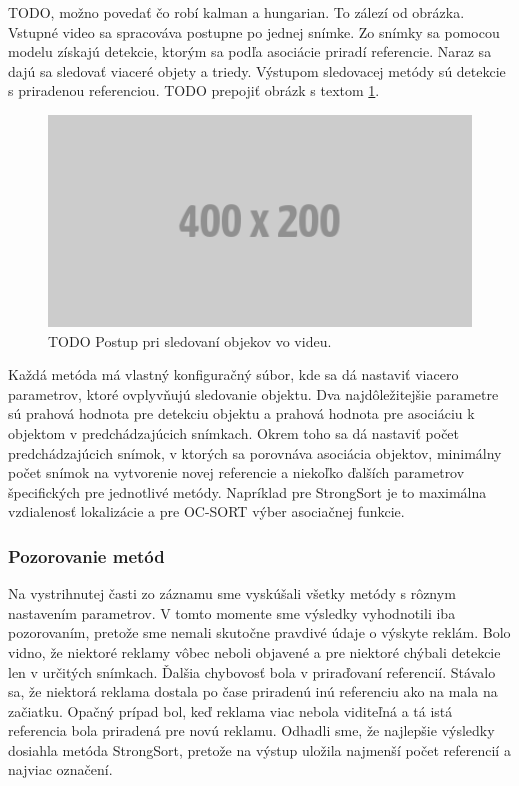 TODO, možno povedať čo robí kalman a hungarian. To zálezí od obrázka. Vstupné video sa spracováva postupne po jednej snímke. Zo snímky sa pomocou modelu získajú detekcie, ktorým sa podľa asociácie priradí referencie. Naraz sa dajú sa sledovať viaceré objety a triedy. Výstupom sledovacej metódy sú detekcie s priradenou referenciou. TODO prepojiť obrázk s textom \ref{img:tracking}.

 \begin{figure}[ht]
     \centering
     \includegraphics[width=1\textwidth]{images/placeholder.png}
     \caption{TODO Postup pri sledovaní objekov vo videu.}
     \label{img:tracking}
 \end{figure}

Každá metóda má vlastný konfiguračný súbor, kde sa dá nastaviť viacero parametrov, ktoré ovplyvňujú sledovanie objektu. Dva najdôležitejšie parametre sú prahová hodnota pre detekciu objektu a prahová hodnota pre asociáciu k objektom v predchádzajúcich snímkach. Okrem toho sa dá nastaviť počet predchádzajúcich snímok, v ktorých sa porovnáva asociácia objektov, minimálny počet snímok na vytvorenie novej referencie a niekoľko ďalších parametrov špecifických pre jednotlivé metódy. Napríklad pre StrongSort je to maximálna vzdialenosť lokalizácie a pre OC-SORT výber asociačnej funkcie.

\subsubsection{Pozorovanie metód}

Na vystrihnutej časti zo záznamu sme vyskúšali všetky metódy s rôznym nastavením parametrov. V tomto momente sme výsledky vyhodnotili iba pozorovaním, pretože sme nemali skutočne pravdivé údaje o výskyte reklám. Bolo vidno, že niektoré reklamy vôbec neboli objavené a pre niektoré chýbali detekcie len v určitých snímkach. Ďalšia chybovosť bola v priraďovaní referencií. Stávalo sa, že niektorá reklama dostala po čase priradenú inú referenciu ako na mala na začiatku. Opačný prípad bol, keď reklama viac nebola viditeľná a tá istá referencia bola priradená pre novú reklamu. Odhadli sme, že najlepšie výsledky dosiahla metóda StrongSort, pretože na výstup uložila najmenší počet referencií a najviac označení.

